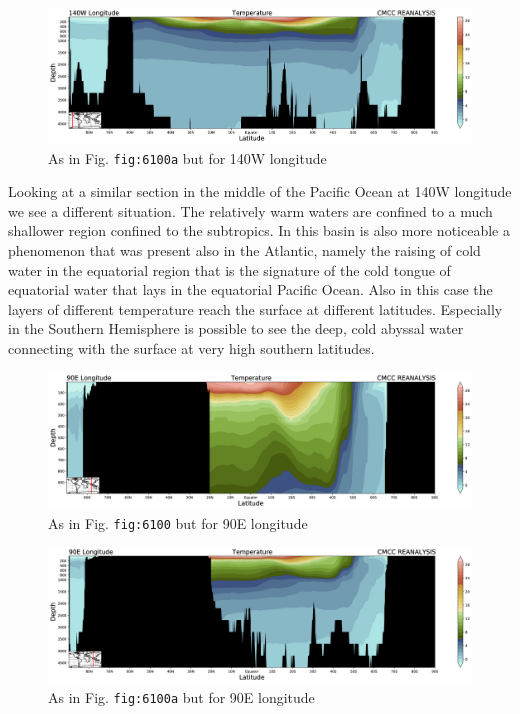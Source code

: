 \begin{figure}
\centering
\includegraphics[width = .7 \textwidth]{figs/GD/Sect140W5000.png}
\caption{As in Fig. \texttt{fig:6100a} but for 140W longitude}
\end{figure}

Looking at a similar section in the middle of the Pacific Ocean at 140W
longitude we see a different situation. The relatively warm waters are
confined to a much shallower region confined to the subtropics. In this
basin is also more noticeable a phenomenon that was present also in the
Atlantic, namely the raising of cold water in the equatorial region that
is the signature of the cold tongue of equatorial water that lays in the
equatorial Pacific Ocean. Also in this case the layers of different
temperature reach the surface at different latitudes. Especially in the
Southern Hemisphere is possible to see the deep, cold abyssal water
connecting with the surface at very high southern latitudes.

\begin{figure}
\centering
\includegraphics[width = .7 \textwidth]{figs/GD/Sect90E1000.png}
\caption{As in Fig. \texttt{fig:6100} but for 90E longitude}
\end{figure}

\begin{figure}
\centering
\includegraphics[width = .7 \textwidth]{figs/GD/Sect90E5000.png}
\caption{As in Fig. \texttt{fig:6100a} but for 90E longitude}
\end{figure}

